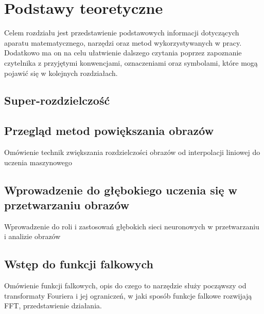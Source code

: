 \chapter{Podstawy teoretyczne}


Celem rozdziału jest przedstawienie podstawowych informacji dotyczących aparatu matematycznego, narzędzi oraz metod wykorzystywanych w pracy.
Dodatkowo ma on na celu ułatwienie dalszego czytania poprzez zapoznanie czytelnika z przyjętymi konwencjami, oznaczeniami oraz symbolami, które mogą pojawić się w kolejnych rozdziałach.

\section{Super-rozdzielczość}





\section{Przegląd metod powiększania obrazów}


Omówienie technik zwiększania rozdzielczości obrazów od interpolacji liniowej do uczenia maszynowego


\section{Wprowadzenie do głębokiego uczenia się w przetwarzaniu obrazów}


Wprowadzenie do roli i zastosowań głębokich sieci neuronowych w przetwarzaniu i analizie obrazów


\section{Wstęp do funkcji falkowych}


Omówienie funkcji falkowych, opis do czego to narzędzie służy począwszy od transformaty Fouriera i jej ograniczeń, 
w jaki sposób funkcje falkowe rozwijają FFT, przedstawienie działania.

